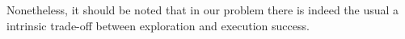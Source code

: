 Nonetheless, it should be noted that in our problem there is indeed the usual a
intrinsic trade-off between exploration and execution success.





% 


